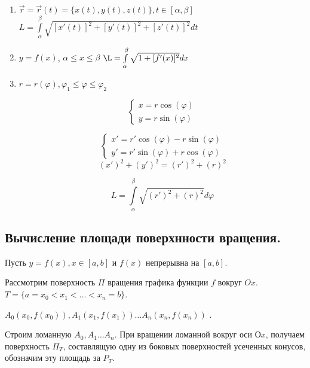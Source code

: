 \documentclass[a4paper,12pt]{article} %
\begin{document}
\begin{enumerate}

    \item $\Vec{r} = \Vec{r}(t) = \{ x(t), y(t), z(t) \}, t \in [\alpha, \beta]$
    $L = \int \limits_\alpha^\beta \sqrt{[x'(t)]^2+[y'(t)]^2+[z'(t)]^2}dt$
    
    \item $y=f(x)$, $\alpha \leq x \leq \beta$
    $\L=\int\limits_\alpha^\beta \sqrt{1+[f'(x)]^2}dx$
    
    \item $r=r(\varphi), \varphi_1 \leq \varphi \leq \varphi_2$
    
    \begin{equation*}
 \begin{cases}
  x=r \cos(\varphi)
   \\
   y = r \sin(\varphi)
   
 \end{cases}
\end{equation*}

 \begin{equation*}
 \begin{cases}
  x'=r' \cos(\varphi) - r\sin(\varphi)
   \\
   y' = r' \sin(\varphi) + r\cos(\varphi)
   
 \end{cases}
\end{equation*}
\begin{equation}
  (x')^2+(y')^2=(r')^2+(r)^2  
\end{equation}

\begin{equation}
  L =\int\limits_\alpha^\beta \sqrt{(r')^2+(r)^2}d\varphi 
\end{equation}

\end{enumerate}

\subsection{Вычисление площади поверхнности вращения.}

Пусть $y = f(x), x \in [a, b]$ и $f(x)$ непрерывна на $[a, b]$.

Рассмотрим поверхность $\Pi$ вращения графика функции $f$ вокруг $Ox$. $T = \{ a = x_0 < x_1<\dots<x_n = b \}$.

$A_0 (x_0, f(x_0)), A_1 (x_1, f(x_1)) \dots A_n(x_n, f(x_n))$ .

Строим ломанную $A_0, A_1\dots A_n$. При вращении ломанной вокруг оси $Оx$, получаем поверхность $\Pi_T$, составлящую одну из боковых поверхностей усеченных конусов, обозначим эту площадь за $P_T$.
\end{document}

